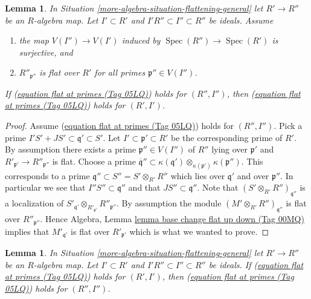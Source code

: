 \documentclass{amsart}
\theoremstyle{plain}
\newtheorem{lemma}[subsection]{Lemma}
\theoremstyle{definition}
\theoremstyle{remark}
\numberwithin{equation}{subsection}
\def\Spec{\mathop{\mathrm{Spec}}}
\begin{document}
\begin{lemma}
\label{more-algebra-lemma-flat-descent-flat-at-primes}
In Situation \ref{more-algebra-situation-flattening-general}
let $R' \to R''$ be an $R$-algebra map.
Let $I' \subset R'$ and $I'R'' \subset I'' \subset R''$ be ideals.
Assume
\begin{enumerate}
\item the map $V(I'') \to V(I')$ induced by
$\Spec(R'') \to \Spec(R')$ is surjective, and
\item $R''_{\mathfrak p''}$ is flat over $R'$ for all primes
$\mathfrak p'' \in V(I'')$.
\end{enumerate}
If (\href{https://stacks.math.columbia.edu/tag/05LQ}{equation flat at primes (Tag 05LQ)}) holds for
$(R'', I'')$, then (\href{https://stacks.math.columbia.edu/tag/05LQ}{equation flat at primes (Tag 05LQ)}) holds for $(R', I')$.
\end{lemma}

\begin{proof}
Assume (\href{https://stacks.math.columbia.edu/tag/05LQ}{equation flat at primes (Tag 05LQ)}) holds for $(R'', I'')$. Pick a prime
$I'S' + JS' \subset \mathfrak q' \subset S'$. Let
$I' \subset \mathfrak p' \subset R'$ be the corresponding prime of $R'$.
By assumption there exists a prime $\mathfrak p'' \in V(I'')$ of $R''$
lying over $\mathfrak p'$ and $R'_{\mathfrak p'} \to R''_{\mathfrak p''}$
is flat. Choose a prime
$\overline{\mathfrak q}'' \subset
\kappa(\mathfrak q') \otimes_{\kappa(\mathfrak p')} \kappa(\mathfrak p'')$.
This corresponds to a prime $\mathfrak q'' \subset S'' = S' \otimes_{R'} R''$
which lies over $\mathfrak q'$ and over $\mathfrak p''$. In particular
we see that $I''S'' \subset \mathfrak q''$ and that
$JS'' \subset \mathfrak q''$. Note that
$(S' \otimes_{R'} R'')_{\mathfrak q''}$ is a localization of
$S'_{\mathfrak q'} \otimes_{R'_{\mathfrak p'}} R''_{\mathfrak p''}$.
By assumption the module $(M' \otimes_{R'} R'')_{\mathfrak q''}$ is
flat over $R''_{\mathfrak p''}$. Hence
Algebra, Lemma \href{https://stacks.math.columbia.edu/tag/00MQ}{lemma base change flat up down (Tag 00MQ)}
implies that $M'_{\mathfrak q'}$ is flat over $R'_{\mathfrak p'}$
which is what we wanted to prove.
\end{proof}


\begin{lemma}
\label{more-algebra-lemma-base-change-flat-at-primes}
In Situation \ref{more-algebra-situation-flattening-general}
let $R' \to R''$ be an $R$-algebra map.
Let $I' \subset R'$ and $I'R'' \subset I'' \subset R''$ be ideals.
If (\href{https://stacks.math.columbia.edu/tag/05LQ}{equation flat at primes (Tag 05LQ)}) holds for
$(R', I')$, then (\href{https://stacks.math.columbia.edu/tag/05LQ}{equation flat at primes (Tag 05LQ)})
holds for $(R'', I'')$.
\end{lemma}
\end{document}
